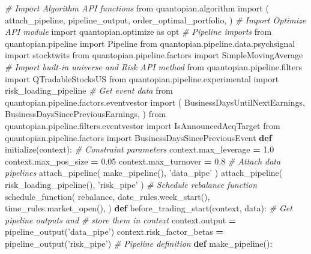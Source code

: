 \documentclass[11,]{article}
\newenvironment{Shaded}{\begin{snugshade}}{\end{snugshade}}
\newcommand{\CommentTok}[1]{\textcolor[rgb]{0.56,0.35,0.01}{\textit{#1}}}
\newcommand{\FloatTok}[1]{\textcolor[rgb]{0.00,0.00,0.81}{#1}}
\newcommand{\ImportTok}[1]{#1}
\newcommand{\KeywordTok}[1]{\textcolor[rgb]{0.13,0.29,0.53}{\textbf{#1}}}
\newcommand{\NormalTok}[1]{#1}
\newcommand{\OperatorTok}[1]{\textcolor[rgb]{0.81,0.36,0.00}{\textbf{#1}}}
\newcommand{\StringTok}[1]{\textcolor[rgb]{0.31,0.60,0.02}{#1}}
\begin{document}
\begin{Shaded}
\begin{Highlighting}[]
\CommentTok{# Import Algorithm API functions}
\ImportTok{from}\NormalTok{ quantopian.algorithm }\ImportTok{import}\NormalTok{ (}
\NormalTok{    attach_pipeline,}
\NormalTok{    pipeline_output,}
\NormalTok{    order_optimal_portfolio,}
\NormalTok{)}
\CommentTok{# Import Optimize API module}
\ImportTok{import}\NormalTok{ quantopian.optimize }\ImportTok{as}\NormalTok{ opt}
\CommentTok{# Pipeline imports}
\ImportTok{from}\NormalTok{ quantopian.pipeline }\ImportTok{import}\NormalTok{ Pipeline}
\ImportTok{from}\NormalTok{ quantopian.pipeline.data.psychsignal }\ImportTok{import}\NormalTok{ stocktwits}
\ImportTok{from}\NormalTok{ quantopian.pipeline.factors }\ImportTok{import}\NormalTok{ SimpleMovingAverage}
\CommentTok{# Import built-in universe and Risk API method}
\ImportTok{from}\NormalTok{ quantopian.pipeline.filters }\ImportTok{import}\NormalTok{ QTradableStocksUS}
\ImportTok{from}\NormalTok{ quantopian.pipeline.experimental }\ImportTok{import}\NormalTok{ risk_loading_pipeline}
\CommentTok{# Get event data }
\ImportTok{from}\NormalTok{ quantopian.pipeline.factors.eventvestor }\ImportTok{import}\NormalTok{ (}
\NormalTok{    BusinessDaysUntilNextEarnings,}
\NormalTok{    BusinessDaysSincePreviousEarnings,}
\NormalTok{)}
\ImportTok{from}\NormalTok{ quantopian.pipeline.filters.eventvestor }\ImportTok{import}\NormalTok{ IsAnnouncedAcqTarget}
\ImportTok{from}\NormalTok{ quantopian.pipeline.factors }\ImportTok{import}\NormalTok{ BusinessDaysSincePreviousEvent}
\KeywordTok{def}\NormalTok{ initialize(context):}
    \CommentTok{# Constraint parameters}
\NormalTok{    context.max_leverage }\OperatorTok{=} \FloatTok{1.0}
\NormalTok{    context.max_pos_size }\OperatorTok{=} \FloatTok{0.05}
\NormalTok{    context.max_turnover }\OperatorTok{=} \FloatTok{0.8}
    \CommentTok{# Attach data pipelines}
\NormalTok{    attach_pipeline(}
\NormalTok{        make_pipeline(),}
        \StringTok{'data_pipe'}
\NormalTok{    )}
\NormalTok{    attach_pipeline(}
\NormalTok{        risk_loading_pipeline(),}
        \StringTok{'risk_pipe'}
\NormalTok{    )}
    \CommentTok{# Schedule rebalance function}
\NormalTok{    schedule_function(}
\NormalTok{        rebalance,}
\NormalTok{        date_rules.week_start(),}
\NormalTok{        time_rules.market_open(),}
\NormalTok{    )}
\KeywordTok{def}\NormalTok{ before_trading_start(context, data):}
    \CommentTok{# Get pipeline outputs and}
    \CommentTok{# store them in context}
\NormalTok{    context.output }\OperatorTok{=}\NormalTok{ pipeline_output(}\StringTok{'data_pipe'}\NormalTok{)}
\NormalTok{    context.risk_factor_betas }\OperatorTok{=}\NormalTok{ pipeline_output(}\StringTok{'risk_pipe'}\NormalTok{)}
\CommentTok{# Pipeline definition}
\KeywordTok{def}\NormalTok{ make_pipeline():}
   

\end{Highlighting}
\end{Shaded}
\end{document}

